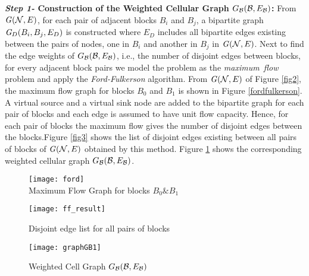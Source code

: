 \documentclass{acm_proc_article-sp}
\begin{document}
{\bf {\it Step 1-} Construction of the Weighted Cellular Graph $G_{\cal B}({\cal B},E_{\cal B})$:} From ${{\it G}}({\cal N}, E)$, for each pair of adjacent blocks $B_i$ and $B_j$, a bipartite graph ${{\it G}}_D(B_i, B_j, E_D)$ is constructed where $E_D$ includes all bipartite edges existing between the pairs of nodes, one in $B_i$ and another in $B_j$ in ${{\it G}}({\cal N}, E)$. Next to find the edge weights of $G_{\cal B}({\cal B},E_{\cal B})$, i.e., the number of disjoint edges between blocks, for every adjacent block pairs we model the problem as the {\it maximum~flow} problem and apply the {\it Ford-Fulkerson} algorithm. From ${{\it G}}({\cal N},E)$ of Figure \ref{fig2}, the maximum flow graph for blocks $B_0$ and $B_1$ is shown in Figure \ref{fordfulkerson}. A virtual source and a virtual sink node are added to the bipartite graph for each pair of blocks and each edge is assumed to have unit flow capacity. Hence, for each pair of blocks the maximum flow gives the number of disjoint edges between the 
blocks.Figure \ref{fig3} shows the list of disjoint edges existing between all pairs of blocks of ${{\it G}}({\cal N}, E)$ obtained by this method. Figure \ref{fig4} shows the corresponding weighted cellular graph $G_{\cal B}({\cal B},E_{\cal B})$.
		\begin{figure}[ht]
\begin{minipage}[b]{0.26\linewidth}
		 \centering
		   \texttt{[image: ford]}\\
		    \caption{\scriptsize{Maximum Flow Graph for blocks $B_0\&B_1$}}
		  \label{fordfulkerson}
		   \end{minipage}
	      \hspace{0.55cm}
	      \begin{minipage}[b]{0.25\linewidth}
		  \centering
		    \texttt{[image: ff\_result]}
		  \caption{\scriptsize{Disjoint edge list for all pairs of blocks}}
		  \label{fig3}
		\end{minipage}
		\hspace{0.6cm}
	      \begin{minipage}[b]{0.21\linewidth}
		  \centering
		     \texttt{[image: graphGB1]}
		  \caption{\scriptsize{Weighted Cell Graph $G_{\cal B}({\cal B},E_{\cal B})$ }}
		  \label{fig4}
		\end{minipage}
		\end{figure}
\end{document}
